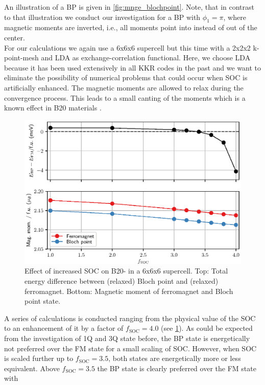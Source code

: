 \documentclass [a4paper, 12pt]{article}
\begin{document}
An illustration of a BP is given in \cref{fig:mnge_blochpoint}. Note, that in contrast to
that illustration we conduct our investigation for a BP with $\phi_{1}=\pi$, where magnetic moments
are inverted, i.e., all moments point into instead of out of the center.
\\
For our calculations we
again use a 6x6x6 supercell but this time with a 2x2x2 k-point-mesh and LDA as
exchange-correlation functional. Here, we choose LDA because it has been used extensively in all KKR codes
in the past and 
we want to eliminate the possibility of numerical problems that could occur when SOC is artificially enhanced.
The magnetic moments are allowed to relax during the convergence process.
This leads to a small canting of the moments which is a known effect in
B20 materials \cite{chizhikov_multishell_2013}.
\begin{figure}[!htb]
  \centering
   \includegraphics[width=1.00\textwidth]{Figures/MnGe_ferro_bp.eps}
	\caption{Effect of increased SOC on B20- in a 6x6x6 supercell.
	Top: Total energy difference between (relaxed) Bloch point and (relaxed) ferromagnet.
	Bottom: Magnetic moment of ferromagnet and Bloch point state.}
\label{fig:MnGe_kkrnano_comparison_bp}
\end{figure}
A series of calculations is conducted ranging from the physical value of the SOC 
to
an enhancement of it by a
factor of $f_{\text{SOC}}=4.0$ (see \cref{fig:MnGe_kkrnano_comparison_bp}).
As could be expected from the investigation of 1Q and 3Q state before,
the BP state is energetically not preferred over the FM state for a small
scaling of SOC.
However, when SOC is scaled further up to $f_{\text{SOC}}=3.5$,
both states are energetically more or less equivalent.
Above $f_{\text{SOC}}=3.5$ the BP state is clearly preferred over the FM state with
\end{document}
